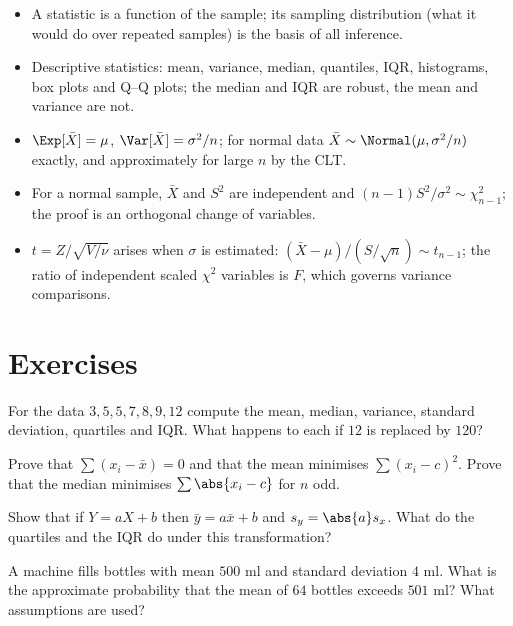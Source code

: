 \begin{summarybox}
\begin{itemize}
  \item A statistic is a function of the sample; its sampling distribution (what it would do over repeated samples) is the basis of all inference.
  \item Descriptive statistics: mean, variance, median, quantiles, IQR, histograms, box plots and Q--Q plots; the median and IQR are robust, the mean and variance are not.
  \item $\Exp[\bar{X}]=\mu$, $\Var[\bar{X}]=\sigma^2/n$; for normal data $\bar{X}\sim\Normal(\mu,\sigma^2/n)$ exactly, and approximately for large $n$ by the CLT.
  \item For a normal sample, $\bar{X}$ and $S^2$ are independent and $(n-1)S^2/\sigma^2\sim\chi^2_{n-1}$; the proof is an orthogonal change of variables.
  \item $t=Z/\sqrt{V/\nu}$ arises when $\sigma$ is estimated: $(\bar{X}-\mu)/(S/\sqrt n)\sim t_{n-1}$; the ratio of independent scaled $\chi^2$ variables is $F$, which governs variance comparisons.
\end{itemize}
\end{summarybox}

\section{Exercises}

\begin{exercise}
For the data $3,5,5,7,8,9,12$ compute the mean, median, variance, standard deviation, quartiles and IQR. What happens to each if $12$ is replaced by $120$?
\end{exercise}

\begin{exercise}
Prove that $\sum(x_i-\bar{x})=0$ and that the mean minimises $\sum(x_i-c)^2$. Prove that the median minimises $\sum\abs{x_i-c}$ for $n$ odd.
\end{exercise}

\begin{exercise}
Show that if $Y=aX+b$ then $\bar{y}=a\bar{x}+b$ and $s_y=\abs{a}s_x$. What do the quartiles and the IQR do under this transformation?
\end{exercise}

\begin{exercise}
A machine fills bottles with mean $500$ ml and standard deviation $4$ ml. What is the approximate probability that the mean of $64$ bottles exceeds $501$ ml? What assumptions are used?
\end{exercise}


